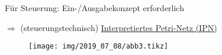 Für Steuerung: Ein-/Ausgabekonzept erforderlich

$\Rightarrow$ (steuerungstechnisch) \underline{Interpretiertes Petri-Netz (IPN)}

\begin{figure}[H]
	\centering
	\texttt{[image: img/2019\_07\_08/abb3.tikz]}
\end{figure}








